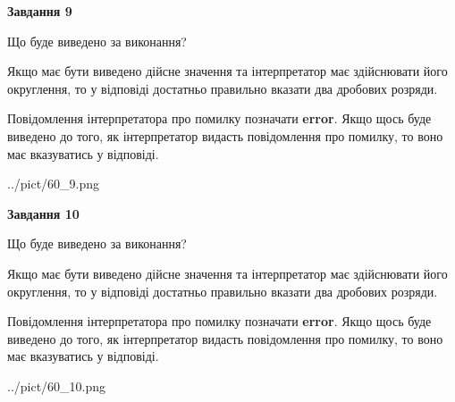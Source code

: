 \documentclass[12pt, ukrainian]{article}
\begin{document}
{\begin {Large}
{\begin {center}\textbf{Завдання 9}\end {center}}\par
Що буде виведено за виконання? \par

Якщо має бути виведено дійсне значення та інтерпретатор має здійснювати його округлення, 
то у відповіді достатньо правильно вказати два дробових розряди.

Повідомлення інтерпретатора про помилку позначати \textbf{error}.
Якщо щось буде виведено до того, як інтерпретатор видасть повідомлення про помилку, 
то воно має вказуватись у відповіді. \par

\begin{center}
	{../pict/60_9.png}
\end{center}
\newpage

{\begin {center}\textbf{Завдання 10}\end {center}}\par
Що буде виведено за виконання? \par

Якщо має бути виведено дійсне значення та інтерпретатор має здійснювати його округлення, 
то у відповіді достатньо правильно вказати два дробових розряди.

Повідомлення інтерпретатора про помилку позначати \textbf{error}.
Якщо щось буде виведено до того, як інтерпретатор видасть повідомлення про помилку, 
то воно має вказуватись у відповіді. \par

\begin{center}
	{../pict/60_10.png}
\end{center}
\newpage

\end {Large}}
\end{document}
